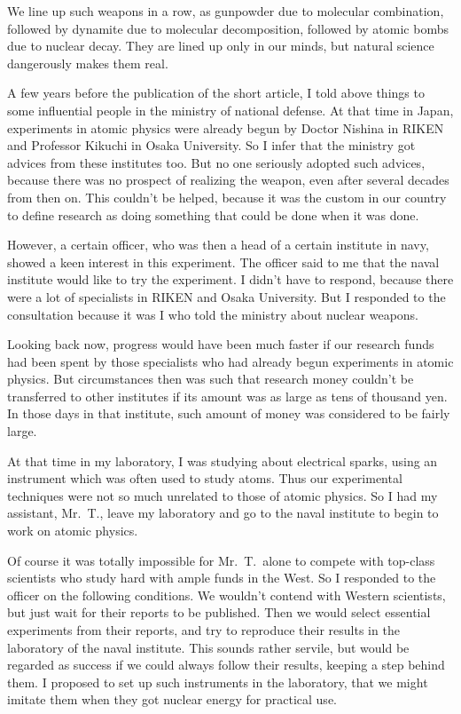 \documentclass[11pt,a4j,twocolumn]{jarticle}
\begin{document}
We line up such weapons in a row, as
gunpowder due to molecular combination,
followed by dynamite due to molecular decomposition,
followed by atomic bombs due to nuclear decay.
They are lined up only in our minds, 
but natural science dangerously makes them real.

A few years before the publication of the short article,
I told above things to some influential people in the ministry of national defense.
At that time in Japan, experiments in atomic physics were already begun
by Doctor Nishina in RIKEN and Professor Kikuchi in Osaka University.
So I infer that the ministry got advices from these institutes too.
But no one seriously adopted such advices, because there was no
prospect of realizing the weapon, even after several decades from then on.
This couldn't be helped, because it was the custom in our country
to define research as doing something that could be done when it was done.

However, a certain officer, who was then a head of a certain institute in navy,
showed a keen interest in this experiment. The officer said to me that
the naval institute would like to try the experiment.
I didn't have to respond, because
there were a lot of specialists in RIKEN and Osaka University. 
But I responded to the consultation because it was I who told
the ministry about nuclear weapons.

Looking back now, progress would have been much faster if
our research funds had been spent by those specialists
who had already begun experiments in atomic physics.
But circumstances then was such that research money couldn't
be transferred to other institutes if its amount was as large as tens of thousand yen.
In those days in that institute, such amount of money was considered
to be fairly large.

At that time in my laboratory, I was studying about electrical sparks,
using an instrument which was often used to study atoms.
Thus our experimental techniques were not so much unrelated to those of atomic physics.
So I had my assistant, Mr.\ T., leave my laboratory and go to the naval institute
to begin to work on atomic physics.

Of course it was totally impossible for Mr.\ T.\ alone to compete with 
top-class scientists who study hard with ample funds in the West.
So I responded to the officer on the following conditions.
We wouldn't contend with Western scientists, but just wait for their reports to be published.
Then we would select essential experiments from their reports, 
and try to reproduce their results in the laboratory of the naval institute.
This sounds rather servile, but would be regarded as success if
we could always follow their results, keeping a step behind them.
I proposed to set up such instruments in the laboratory, that
we might imitate them when they got nuclear energy for practical use.
\end{document}
